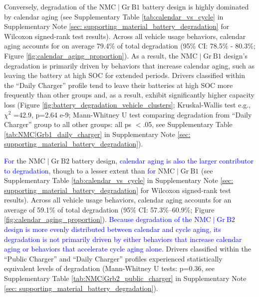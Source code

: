 \documentclass[pdflatex,sn-nature]{sn-jnl}%
\theoremstyle{thmstyleone}%
\theoremstyle{thmstyletwo}%
\theoremstyle{thmstylethree}%
\begin{document}
Conversely, degradation of the $\mathrm{NMC}\mid\mathrm{Gr~B1}$ battery design is highly dominated by calendar aging (see Supplementary Table \ref{tab:calendar_vs_cycle} in Supplementary Note \ref{sec: supporting_material_battery_degradation} for Wilcoxon signed-rank test results). Across all vehicle usage behaviors, calendar aging accounts for on average 79.4\% of total degradation (95\% CI: 78.5\% - 80.3\%; Figure \ref{fig:calendar_aging_proportion}). As a result, the $\mathrm{NMC}\mid\mathrm{Gr~B1}$ design’s degradation is primarily driven by behaviors that increase calendar aging, such as leaving the battery at high SOC for extended periods.  Drivers classified within the ``Daily Charger'' profile tend to leave their batteries at high SOC more frequently than other groups and, as a result, exhibit significantly higher capacity loss (Figure \ref{fig:battery_degradation_vehicle_clusters}; Kruskal-Wallis test e.g., $\chi^2$ =42.9, p=2.64 e-9;  Mann-Whitney U test comparing degradation from ``Daily Charger'' group to all other groups: all ps $<$.05, see Supplementary Table \ref{tab:NMC|Grb1_daily_charger} in Supplementary Note \ref{sec: supporting_material_battery_degradation}). 

\textcolor{blue}{For} the $\mathrm{NMC}\mid\mathrm{Gr~B2}$ battery design\textcolor{blue}{, calendar aging is also the larger contributor to degradation}, though to a lesser extent than \textcolor{blue}{for} $\mathrm{NMC}\mid\mathrm{Gr~B1}$ (see Supplementary Table \ref{tab:calendar_vs_cycle} in Supplementary Note \ref{sec: supporting_material_battery_degradation} for Wilcoxon signed-rank test results). Across all vehicle usage behaviors, calendar aging accounts for an average of 59.1\% of total degradation (95\% CI: 57.3\%–60.9\%; Figure \ref{fig:calendar_aging_proportion}). \textcolor{blue}{Because degradation of the $\mathrm{NMC}\mid\mathrm{Gr~B2}$ design is more evenly distributed between calendar and cycle aging, its degradation is not primarily driven by either behaviors that increase calendar aging or behaviors that accelerate cycle aging alone.} Drivers classified within the ``Public Charger'' and ``Daily Charger'' profiles experienced statistically equivalent levels of degradation (Mann-Whitney U tests: p=0.36, see Supplementary Table \ref{tab:NMC|Grb2_public_charger} in Supplementary Note \ref{sec: supporting_material_battery_degradation}).
\end{document}
